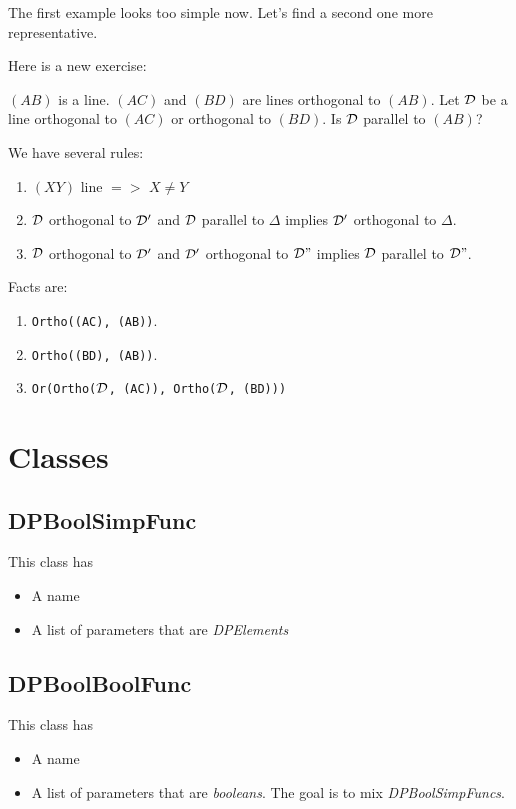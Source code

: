 \documentclass[a4paper]{article}
\begin{document}
The first example looks too simple now. Let's find a second one more representative.

Here is a new exercise:

$(AB)$ is a line. $(AC)$ and $(BD)$ are lines orthogonal to $(AB)$.
Let $\cal{D}$ be a line orthogonal to $(AC)$ or orthogonal to $(BD)$.
Is $\cal D$ parallel to $(AB)$?

We have several rules:
\begin{enumerate}
\item $(XY)$ line $=>$ $X\neq Y$
\item $\cal D$ orthogonal to $\cal D'$ and $\cal D$ parallel to $\Delta$ implies $\cal D'$ orthogonal to $\Delta$.
\item $\cal D$ orthogonal to $\cal D'$ and $\cal D'$ orthogonal to $\cal D"$ implies $\cal D$ parallel to $\cal D"$.
\end{enumerate}

Facts are:
\begin{enumerate}
\item \texttt{Ortho((AC), (AB))}.
\item \texttt{Ortho((BD), (AB))}.
\item \texttt{Or(Ortho($\cal D$, (AC)), Ortho($\cal D$, (BD)))}
\end{enumerate}


\section{Classes}
\subsection{DPBoolSimpFunc}

This class has
\begin{itemize}
\item A name
\item A list of parameters that are \textit{DPElements}
\end{itemize}

\subsection{DPBoolBoolFunc}

This class has
\begin{itemize}
\item A name
\item A list of parameters that are \textit{booleans}. The goal is to mix \textit{DPBoolSimpFuncs}.
\end{itemize}
\end{document}
